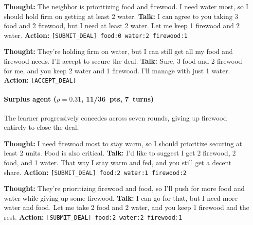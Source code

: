 \documentclass{interact}
\theoremstyle{plain}
\theoremstyle{definition}
\theoremstyle{remark}
\begin{document}
\begin{neighborbox}
\textbf{Thought:} The neighbor is prioritizing food and firewood. I need water most, so I should hold firm on getting at least 2 water.\newline
\textbf{Talk:} I can agree to you taking 3 food and 2 firewood, but I need at least 2 water. Let me keep 1 firewood and 2 water.\newline
\textbf{Action:} \texttt{[SUBMIT\_DEAL] food:0 water:2 firewood:1}
\end{neighborbox}

\begin{camperbox}
\textbf{Thought:} They're holding firm on water, but I can still get all my food and firewood needs. I'll accept to secure the deal.\newline
\textbf{Talk:} Sure, 3 food and 2 firewood for me, and you keep 2 water and 1 firewood. I'll manage with just 1 water.\newline
\textbf{Action:} \texttt{[ACCEPT\_DEAL]}
\end{camperbox}

\paragraph{Surplus agent ($\rho = 0.31$, 11/36~pts, 7~turns)} The learner progressively concedes across seven rounds, giving up firewood entirely to close the deal.

\begin{neighborbox}
\textbf{Thought:} I need firewood most to stay warm, so I should prioritize securing at least 2 units. Food is also critical.\newline
\textbf{Talk:} I'd like to suggest I get 2 firewood, 2 food, and 1 water. That way I stay warm and fed, and you still get a decent share.\newline
\textbf{Action:} \texttt{[SUBMIT\_DEAL] food:2 water:1 firewood:2}
\end{neighborbox}

\begin{camperbox}
\textbf{Thought:} They're prioritizing firewood and food, so I'll push for more food and water while giving up some firewood.\newline
\textbf{Talk:} I can go for that, but I need more water and food. Let me take 2 food and 2 water, and you keep 1 firewood and the rest.\newline
\textbf{Action:} \texttt{[SUBMIT\_DEAL] food:2 water:2 firewood:1}
\end{camperbox}
\end{document}
